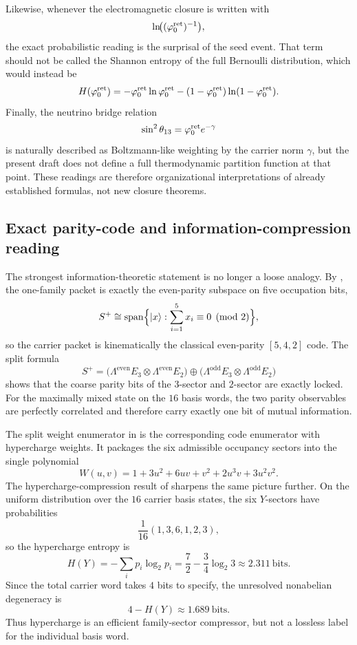 Likewise, whenever the electromagnetic closure is written with
\[
\ln\!\bigl((\varphi_0^{\mathrm{ret}})^{-1}\bigr),
\]
the exact probabilistic reading is the surprisal of the seed event. That term should not be called the Shannon entropy of the full Bernoulli distribution, which would instead be
\[
H(\varphi_0^{\mathrm{ret}})
=
-\varphi_0^{\mathrm{ret}}\ln\varphi_0^{\mathrm{ret}}-(1-\varphi_0^{\mathrm{ret}})\ln(1-\varphi_0^{\mathrm{ret}}).
\]
Finally, the neutrino bridge relation
\[
\sin^2\theta_{13}=\varphi_0^{\mathrm{ret}} e^{-\gamma}
\]
is naturally described as Boltzmann-like weighting by the carrier norm $\gamma$, but the present draft does not define a full thermodynamic partition function at that point. These readings are therefore organizational interpretations of already established formulas, not new closure theorems.

\subsection{Exact parity-code and information-compression reading}

The strongest information-theoretic statement is no longer a loose analogy. By , the one-family packet is exactly the even-parity subspace on five occupation bits,
\[
S^+
\cong
\mathrm{span}\Bigl\{|x\rangle:\sum_{i=1}^5 x_i\equiv 0 \pmod 2\Bigr\},
\]
so the carrier packet is kinematically the classical even-parity $[5,4,2]$ code. The split formula
\[
S^+
=
\bigl(\Lambda^{\mathrm{even}}E_3\otimes\Lambda^{\mathrm{even}}E_2\bigr)
\oplus
\bigl(\Lambda^{\mathrm{odd}}E_3\otimes\Lambda^{\mathrm{odd}}E_2\bigr)
\]
shows that the coarse parity bits of the $3$-sector and $2$-sector are exactly locked. For the maximally mixed state on the $16$ basis words, the two parity observables are perfectly correlated and therefore carry exactly one bit of mutual information.

The split weight enumerator in  is the corresponding code enumerator with hypercharge weights. It packages the six admissible occupancy sectors into the single polynomial
\[
W(u,v)
=
1+3u^2+6uv+v^2+2u^3v+3u^2v^2.
\]
The hypercharge-compression result of  sharpens the same picture further. On the uniform distribution over the $16$ carrier basis states, the six $Y$-sectors have probabilities
\[
\frac1{16}(1,3,6,1,2,3),
\]
so the hypercharge entropy is
\[
H(Y)
=
-\sum_i p_i\log_2 p_i
=
\frac72-\frac34\log_2 3
\approx
\num{2.311}\ \text{bits}.
\]
Since the total carrier word takes $4$ bits to specify, the unresolved nonabelian degeneracy is
\[
4-H(Y)\approx \num{1.689}\ \text{bits}.
\]
Thus hypercharge is an efficient family-sector compressor, but not a lossless label for the individual basis word.

